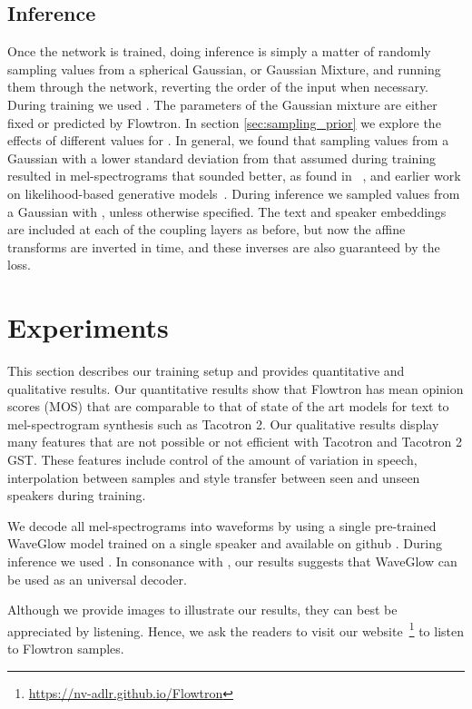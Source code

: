 \documentclass{article}
\begin{document}
\subsection{Inference}
Once the network is trained, doing inference is simply a matter of randomly sampling  values from a spherical Gaussian, or Gaussian Mixture, and running them through the network, reverting the order of the input when necessary. During training we used . The parameters of the Gaussian mixture are either fixed or predicted by Flowtron. In section \ref{sec:sampling_prior} we explore the effects of different values for .  In general, we found that sampling  values from a Gaussian with a lower standard deviation from that assumed during training resulted in mel-spectrograms that sounded better, as found in ~\cite{kingma2018glow}, and earlier work on likelihood-based generative models~\cite{parmar2018image}. During inference we sampled  values from a Gaussian with , unless otherwise specified. The text and speaker embeddings are included at each of the coupling layers as before, but now the affine transforms are inverted in time, and these inverses are also guaranteed by the loss. \section{Experiments}\label{sec:experiments}
This section describes our training setup and provides quantitative and qualitative results.
Our quantitative results show that Flowtron has mean opinion scores (MOS) that are comparable to that of state of the art models for text to mel-spectrogram synthesis such as Tacotron 2. Our qualitative results display many features that are not possible or not efficient with Tacotron and Tacotron 2 GST. These features include control of the amount of variation in speech, interpolation between samples and style transfer between seen and unseen speakers during training.

We decode all mel-spectrograms into waveforms by using a single pre-trained WaveGlow \cite{prenger2019waveglow} model trained on a single speaker and available on github \cite{mellotron2020github}. During inference we used . In consonance with \cite{valle2019mellotron}, our results suggests that WaveGlow can be used as an universal decoder.

Although we provide images to illustrate our results, they can best be appreciated by listening. Hence, we ask the readers to visit our website~\footnote{\href{https://nv-adlr.github.io/Flowtron}{https://nv-adlr.github.io/Flowtron}} to listen to Flowtron samples.
\end{document}
